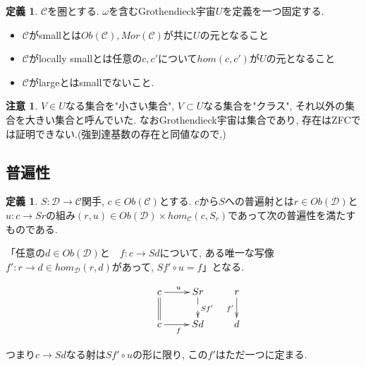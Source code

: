 \documentclass[dvipdfmx,a4paper,11pt]{article}
\theoremstyle{definition}
\newtheorem{dfn}[thm]{定義}
\newtheorem{rem}[thm]{注意}
\begin{document}
 \begin{tcolorbox}
 [colback = white, colframe = green!35!black, fonttitle = \bfseries,breakable = true]
\begin{dfn}
$\mathcal{C}$を圏とする.
$\omega$を含むGrothendieck宇宙$U$を定義を一つ固定する.  
\begin{itemize}
\item $\mathcal{C}$がsmallとは$Ob(\mathcal{C}), Mor(\mathcal{C})$が共に$U$の元となること
\item $\mathcal{C}$がlocally smallとは任意の$c, c'$について$hom(c,c')$が$U$の元となること
\item $\mathcal{C}$がlargeとはsmallでないこと. 
\end{itemize}
\end{dfn}
\end{tcolorbox}
\begin{rem}
$V \in U$なる集合を"小さい集合", $V \subset U$なる集合を"クラス", それ以外の集合を大きい集合と呼んでいた. 
なおGrothendieck宇宙は集合であり, 存在はZFCでは証明できない.(強到達基数の存在と同値なので,)
\end{rem}

\subsection{普遍性}

 \begin{tcolorbox}
 [colback = white, colframe = green!35!black, fonttitle = \bfseries,breakable = true]
\begin{dfn}
$S : \mathcal{D} \to \mathcal{C}$関手, $c \in Ob(\mathcal{C})$とする.
$c$から$S$への普遍射とは$r \in Ob(\mathcal{D})$と $u: c \to Sr$の組み$(r,u) \in Ob(\mathcal{D})\times hom_{\mathcal{C}}(c, S_r)$であって次の普遍性を満たすものである.

「任意の$d \in Ob(\mathcal{D})$と　$f : c\to Sd$について, ある唯一な写像$f' : r \to d \in hom_{\mathcal{D}}(r,d)$があって, $Sf' \circ u =f$」となる.

\begin{equation*}
\xymatrix@C=25pt@R=20pt{
&c\ar@{=}[d]  \ar@{->}[r]^{u} & Sr\ar@{-->}[d]^{Sf'} &r\ar@{->}[d]_{f'}\\
&c\ar@{->}[r]_{f} &Sd&d \\   
}
\end{equation*}
\end{dfn}
つまり$c \to Sd$なる射は$Sf' \circ u$の形に限り, この$f'$はただ一つに定まる. 
 \end{tcolorbox}
\end{document}
